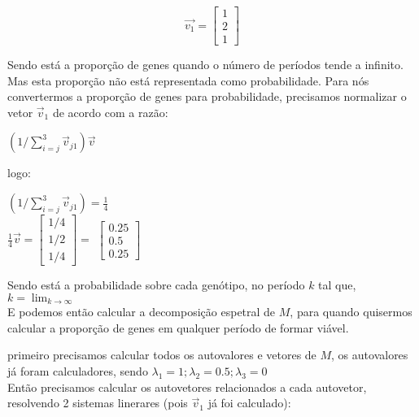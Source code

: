 \documentclass[14pt]{article}
\begin{document}
\begin{displaymath}
\vec{v_1} = \begin{bmatrix}
1\\
2\\
1
\end{bmatrix}
\end{displaymath}

Sendo está a proporção de genes quando o número de períodos tende a infinito.
Mas esta proporção não está representada como probabilidade. Para nós convertermos a proporção de genes para probabilidade, precisamos normalizar o vetor $\vec{v}_1$ de acordo com a razão:\\

\begin{center}
    $\left( 1 / \sum_{i=j}^{3} \vec{v}_{j1} \right)\vec{v}$    
\end{center}

$ $\\

logo:
\begin{center}
    $\left( 1 / \sum_{i=j}^{3} \vec{v}_{j1} \right) = \frac{1}{4}$\\
    $ $\\
    $ $\\
    $\frac{1}{4} \vec{v} =  \begin{bmatrix} 1/4\\ 1/2\\ 1/4 \end{bmatrix} = $
    $\begin{bmatrix} 0.25\\ 0.5\\ 0.25 \end{bmatrix}$
\end{center}

Sendo está a probabilidade sobre cada genótipo, no período $k$ tal que,  $k = \lim_{k\to\infty}$\\

E podemos então calcular a decomposição espetral de $M$, para quando quisermos calcular a proporção de genes em qualquer período de formar viável.

primeiro precisamos calcular todos os autovalores e vetores de $M$, os autovalores já foram calculadores, sendo $\lambda_1 = 1; \lambda_2 = 0.5; \lambda_3 = 0$\\

Então precisamos calcular os autovetores relacionados a cada autovetor, resolvendo 2 sistemas linerares (pois $\vec{v}_1$ já foi calculado):\\
\end{document}
